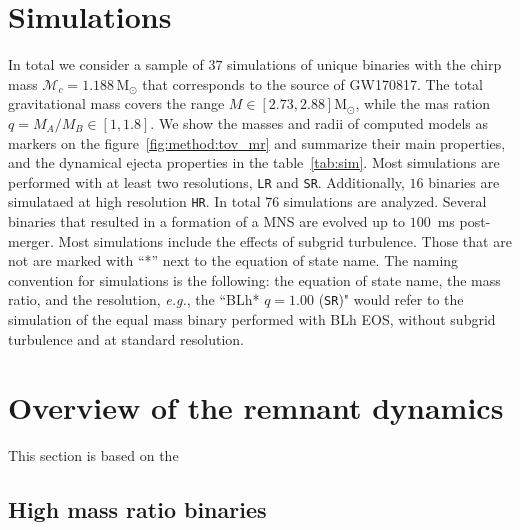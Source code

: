 \documentclass[11pt,a4paper,headinclude=true,DIV=14,BCOR=8mm,chapterprefix,listof=totoc,twoside,openright,abstracton]{scrbook}
\def\Msun{{\text{M}_{\odot}}}
\newcommand{\GW}{GW170817}
\newcommand{\eg}{\textit{e.g.}}
\newcommand{\pmerg}{post-merger}
\begin{document}
\section{Simulations}






In total we consider a sample of $37$ simulations of unique binaries with the 
chirp mass $\mathcal{M}_c = 1.188\,\Msun$ that corresponds to the source of \GW{}.
The total gravitational mass covers the range $M\in[2.73, 2.88]\Msun$, while the 
mas ration $q=M_A/M_B\in[1,1.8]$. 
We show the masses and radii of computed models as markers on the 
figure~\ref{fig:method:tov_mr} and summarize their main properties, 
and the dynamical ejecta properties in the table~\ref{tab:sim}.
Most simulations are performed with at least two resolutions, 
\texttt{LR} and \texttt{SR}. 
Additionally, $16$ binaries are simulataed at high resolution \texttt{HR}.
In total $76$ simulations are analyzed.
Several binaries that resulted in a formation of a MNS are evolved up to 
$100$~ms \pmerg.
Most simulations include the effects of subgrid turbulence. 
Those that are not are marked with ``*'' next to the equation of state name.
The naming convention for simulations is the following: 
the equation of state name, the mass ratio, and the resolution, \eg, 
the ``BLh* $q=1.00$ (\texttt{SR})" would refer to the simulation of the equal mass
binary performed with BLh EOS, without subgrid turbulence and at standard resolution. 



\section{Overview of the remnant dynamics}

This section is based on the \cite{Nedora:2020pak}

\subsection{High mass ratio binaries}
\end{document}
